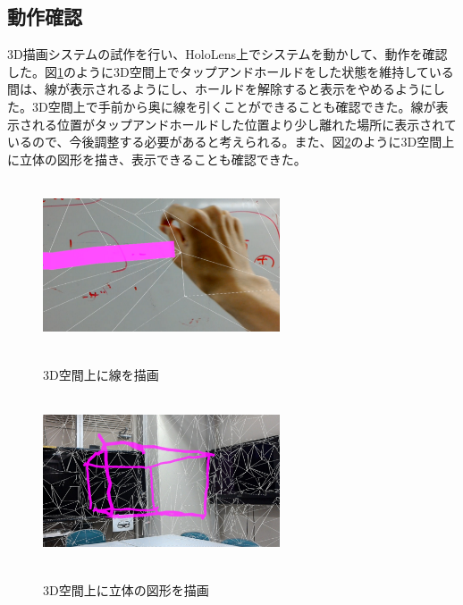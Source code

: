 \documentclass{hissymp}
\begin{document}
\subsection{動作確認}
3D描画システムの試作を行い、HoloLens上でシステムを動かして、動作を確認した。図\ref{fig:linedraw}のように3D空間上でタップアンドホールドをした状態を維持している間は、線が表示されるようにし、ホールドを解除すると表示をやめるようにした。3D空間上で手前から奥に線を引くことができることも確認できた。線が表示される位置がタップアンドホールドした位置より少し離れた場所に表示されているので、今後調整する必要があると考えられる。また、図\ref{fig:rittai}のように3D空間上に立体の図形を描き、表示できることも確認できた。

\begin{figure}[h]
  \begin{center}
    \includegraphics[clip,height=5.0cm,width=7.0cm]{./linedraw.eps}
    \caption{3D空間上に線を描画}
    \label{fig:linedraw}
  \end{center}
\end{figure}

\begin{figure}[h]
  \begin{center}
    \includegraphics[clip,height=5.0cm,width=7.0cm]{./rittai.eps}
    \caption{3D空間上に立体の図形を描画}
    \label{fig:rittai}
  \end{center}
\end{figure}
\end{document}
